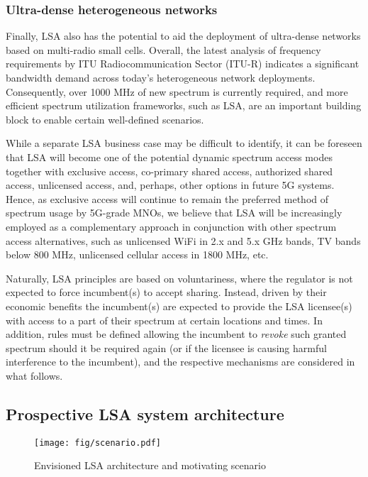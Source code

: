\documentclass[journal]{IEEEtran}
\begin{document}
\subsubsection{Ultra-dense heterogeneous networks} Finally, LSA also has the potential to aid the deployment of ultra-dense networks based on multi-radio small cells. Overall, the latest analysis of frequency requirements by ITU Radiocommunication Sector (ITU-R) indicates a significant bandwidth demand across today's heterogeneous network deployments. Consequently, over 1000 MHz of new spectrum is currently required, and more efficient spectrum utilization frameworks, such as LSA, are an important building block to enable certain well-defined scenarios.

While a separate LSA business case may be difficult to identify, it can be foreseen that LSA will become one of the potential dynamic spectrum access modes together with exclusive access, co-primary shared access, authorized shared access, unlicensed access, and, perhaps, other options in future 5G systems. Hence, as exclusive access will continue to remain the preferred method of spectrum usage by 5G-grade MNOs, we believe that LSA will be increasingly employed as a complementary approach in conjunction with other spectrum access alternatives, such as unlicensed WiFi in 2.x and 5.x GHz bands, TV bands below 800 MHz, unlicensed cellular access in 1800 MHz, etc.

Naturally, LSA principles are based on voluntariness, where the regulator is not expected to force incumbent(s) to accept sharing. Instead, driven by their economic benefits the incumbent(s) are expected to provide the LSA licensee(s) with access to a part of their spectrum at certain locations and times. In addition, rules must be defined allowing the incumbent to \textit{revoke} such granted spectrum should it be required again (or if the licensee is causing harmful interference to the incumbent), and the respective mechanisms are considered in what follows.

\subsection{Prospective LSA system architecture}

\begin{figure*}[!ht]
\centering
\texttt{[image: fig/scenario.pdf]}
\caption{Envisioned LSA architecture and motivating scenario}
\label{fig:scenario}
\end{figure*}
\end{document}
